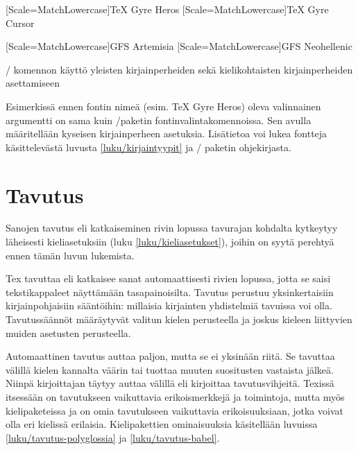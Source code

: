 \begin{esimerkki*}

\begin{koodilohko}
[Scale=MatchLowercase]{TeX Gyre Heros}
[Scale=MatchLowercase]{TeX Gyre Cursor}

[Scale=MatchLowercase]{GFS Artemisia}
[Scale=MatchLowercase]{GFS Neohellenic}
\end{koodilohko}
  \caption{\-/ komennon käyttö yleisten
    kirjainperheiden sekä kielikohtaisten kirjainperheiden asettamiseen}
  \label{esim/babelfont}
\end{esimerkki*}

Esimerkissä ennen fontin nimeä (esim. TeX Gyre Heros) oleva valinnainen
argumentti on sama kuin \-/paketin
fontinvalintakomennoissa. Sen avulla määritellään kyseisen
kirjainperheen asetuksia. Lisätietoa voi lukea fontteja käsittelevästä
luvusta \ref{luku/kirjaintyypit} ja \-/ paketin
ohjekirjasta.

\section{Tavutus}
\label{luku/tavutus}

Sanojen tavutus eli katkaiseminen rivin lopussa tavurajan kohdalta
kytkeytyy läheisesti kieliasetuksiin (luku \ref{luku/kieliasetukset}),
joihin on syytä perehtyä ennen tämän luvun lukemista.

Tex tavuttaa eli katkaisee sanat automaattisesti rivien lopussa, jotta
se saisi tekstikappaleet näyttämään tasapainoisilta. Tavutus perustuu
yksinkertaisiin kirjainpohjaisiin sääntöihin: millaisia kirjainten
yhdistelmiä tavuissa voi olla. Tavutussäännöt määräytyvät valitun kielen
perusteella ja joskus kieleen liittyvien muiden asetusten perusteella.

Automaattinen tavutus auttaa paljon, mutta se ei yksinään riitä. Se
tavuttaa välillä kielen kannalta väärin tai tuottaa muuten suositusten
vastaista jälkeä. Niinpä kirjoittajan täytyy auttaa välillä eli
kirjoittaa tavutusvihjeitä. Texissä itsessään on tavutukseen vaikuttavia
erikoismerkkejä ja toimintoja, mutta myös kielipaketeissa
 ja  on omia tavutukseen vaikuttavia
erikoisuuksiaan, jotka voivat olla eri kielissä erilaisia.
Kielipakettien ominaisuuksia käsitellään luvuissa
\ref{luku/tavutus-polyglossia} ja \ref{luku/tavutus-babel}.

